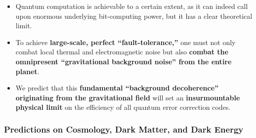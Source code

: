 \documentclass[11pt, a4paper]{article}
\begin{document}
\begin{enumerate}
\begin{itemize}
\begin{itemize}
            \item Quantum computation is achievable to a certain extent, as it can indeed call upon enormous underlying bit-computing power, but it has a clear theoretical limit.
            \item To achieve \textbf{large-scale, perfect ``fault-tolerance,''} one must not only combat local thermal and electromagnetic noise but also \textbf{combat the omnipresent ``gravitational background noise'' from the entire planet}.
            \item We predict that this \textbf{fundamental ``background decoherence'' originating from the gravitational field} will set an \textbf{insurmountable physical limit} on the efficiency of all quantum error correction codes.
        \end{itemize}
    \end{itemize}
\end{enumerate}

\subsubsection{Predictions on Cosmology, Dark Matter, and Dark Energy}
\end{document}
